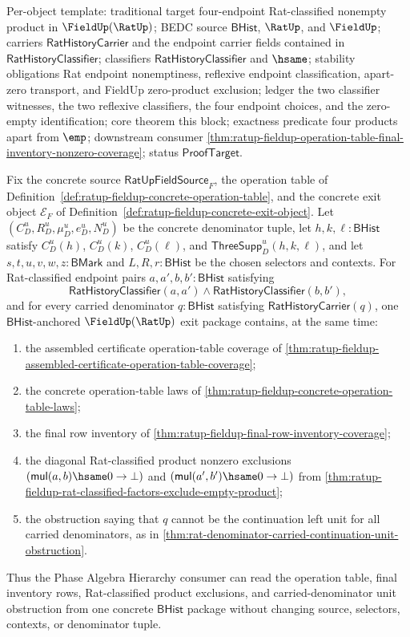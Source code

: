 Per-object template: traditional target four-endpoint Rat-classified nonempty
product in $\FieldUp(\RatUp)$; BEDC source $\mathsf{BHist}$,
$\RatUp$, and $\FieldUp$; carriers $\mathsf{RatHistoryCarrier}$ and the
endpoint carrier fields contained in $\mathsf{RatHistoryClassifier}$;
classifiers $\mathsf{RatHistoryClassifier}$ and $\hsame$; stability obligations
Rat endpoint nonemptiness, reflexive endpoint classification, apart-zero
transport, and FieldUp zero-product exclusion; ledger the two classifier
witnesses, the two reflexive classifiers, the four endpoint choices, and the
zero-empty identification; core theorem this block; exactness predicate four
products apart from $\emp$; downstream consumer
\autoref{thm:ratup-fieldup-operation-table-final-inventory-nonzero-coverage};
status $\mathsf{ProofTarget}$.

\begin{theorem}
\label{thm:ratup-fieldup-operation-table-final-inventory-nonzero-coverage}
Fix the concrete source $\mathsf{RatUpFieldSource}_F$, the operation table of
Definition~\ref{def:ratup-fieldup-concrete-operation-table}, and the concrete
exit object $\mathcal E_F$ of
Definition~\ref{def:ratup-fieldup-concrete-exit-object}. Let
$(C_D^u,R_D^u,\mu_D^u,e_D^u,N_D^u)$ be the concrete denominator tuple, let
$h,k,\ell:\mathsf{BHist}$ satisfy $C_D^u(h)$, $C_D^u(k)$, $C_D^u(\ell)$, and
$\mathsf{ThreeSupp}_D^u(h,k,\ell)$, and let
$s,t,u,v,w,z:\mathsf{BMark}$ and $L,R,r:\mathsf{BHist}$ be the chosen selectors
and contexts. For Rat-classified endpoint pairs
$a,a',b,b':\mathsf{BHist}$ satisfying
$$
\mathsf{RatHistoryClassifier}(a,a')
\land
\mathsf{RatHistoryClassifier}(b,b'),
$$
and for every carried denominator $q:\mathsf{BHist}$ satisfying
$\mathsf{RatHistoryCarrier}(q)$, one $\mathsf{BHist}$-anchored
$\FieldUp(\RatUp)$ exit package contains, at the same time:
\begin{enumerate}
  \item the assembled certificate operation-table coverage of
  \autoref{thm:ratup-fieldup-assembled-certificate-operation-table-coverage};
  \item the concrete operation-table laws of
  \autoref{thm:ratup-fieldup-concrete-operation-table-laws};
  \item the final row inventory of
  \autoref{thm:ratup-fieldup-final-row-inventory-coverage};
  \item the diagonal Rat-classified product nonzero exclusions
  $(\mathsf{mul}(a,b)\hsame0\to\bot)$ and
  $(\mathsf{mul}(a',b')\hsame0\to\bot)$ from
  \autoref{thm:ratup-fieldup-rat-classified-factors-exclude-empty-product};
  \item the obstruction saying that $q$ cannot be the continuation left unit for
  all carried denominators, as in
  \autoref{thm:rat-denominator-carried-continuation-unit-obstruction}.
\end{enumerate}
Thus the Phase Algebra Hierarchy consumer can read the operation table, final
inventory rows, Rat-classified product exclusions, and carried-denominator unit
obstruction from one concrete $\mathsf{BHist}$ package without changing source,
selectors, contexts, or denominator tuple.
\end{theorem}
